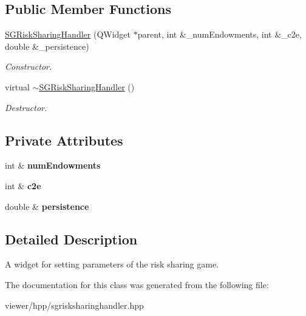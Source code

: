 \subsection*{Public Member Functions}
\begin{DoxyCompactItemize}
\item 
\mbox{\label{classSGRiskSharingHandler_a6d298cd5dd40dbad6323ff6f3cb49e68}} 
\hyperlink{classSGRiskSharingHandler_a6d298cd5dd40dbad6323ff6f3cb49e68}{S\+G\+Risk\+Sharing\+Handler} (Q\+Widget $\ast$parent, int \&\+\_\+num\+Endowments, int \&\+\_\+c2e, double \&\+\_\+persistence)
\begin{DoxyCompactList}\small\item\em Constructor. \end{DoxyCompactList}\item 
\mbox{\label{classSGRiskSharingHandler_a3d0e4e01441f1a45a070c224679ea71c}} 
virtual \hyperlink{classSGRiskSharingHandler_a3d0e4e01441f1a45a070c224679ea71c}{$\sim$\+S\+G\+Risk\+Sharing\+Handler} ()
\begin{DoxyCompactList}\small\item\em Destructor. \end{DoxyCompactList}\end{DoxyCompactItemize}
\subsection*{Private Attributes}
\begin{DoxyCompactItemize}
\item 
\mbox{\label{classSGRiskSharingHandler_a3970a17575b3810ef1240149ef5f37c1}} 
int \& {\bfseries num\+Endowments}
\item 
\mbox{\label{classSGRiskSharingHandler_ac27e1cda2210b457b875f173254c0d8a}} 
int \& {\bfseries c2e}
\item 
\mbox{\label{classSGRiskSharingHandler_a36cf6133a02dbe6f31f10bcc1706f45a}} 
double \& {\bfseries persistence}
\end{DoxyCompactItemize}


\subsection{Detailed Description}
A widget for setting parameters of the risk sharing game. 

The documentation for this class was generated from the following file\+:\begin{DoxyCompactItemize}
\item 
viewer/hpp/sgrisksharinghandler.\+hpp\end{DoxyCompactItemize}
